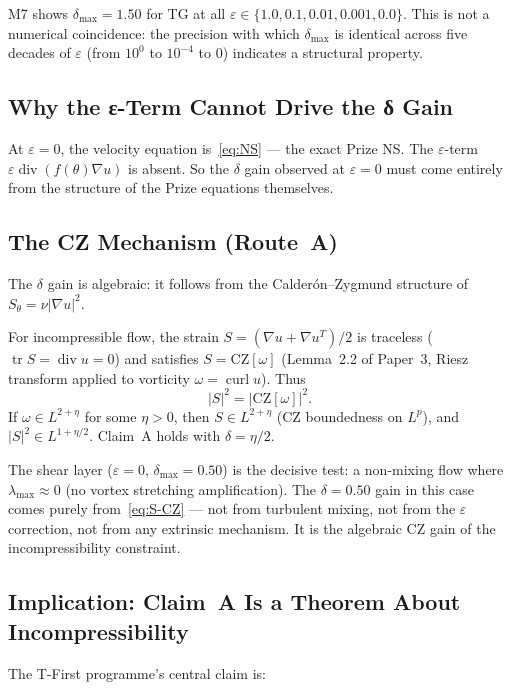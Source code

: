 \documentclass[11pt]{article}
\theoremstyle{definition}
\theoremstyle{remark}
\newcommand{\grad}{\nabla}
\newcommand{\divg}{\operatorname{div}}
\newcommand{\curl}{\operatorname{curl}}
\newcommand{\Sth}{S_\theta}
\newcommand{\dlt}{\delta}
\newcommand{\eps}{\varepsilon}
\begin{document}
M7 shows $\dlt_{\max}=1.50$ for TG at all $\eps\in\{1.0,0.1,0.01,0.001,0.0\}$.
This is not a numerical coincidence: the precision with which $\dlt_{\max}$
is identical across five decades of $\eps$ (from $10^0$ to $10^{-4}$ to $0$)
indicates a structural property.

\subsection{Why the ε-Term Cannot Drive the δ Gain}

At $\eps=0$, the velocity equation is~\eqref{eq:NS} — the exact Prize NS.
The $\eps$-term $\eps\divg(f(\theta)\grad u)$ is absent.  So the $\dlt$ gain
observed at $\eps=0$ must come entirely from the structure of the Prize
equations themselves.

\subsection{The CZ Mechanism (Route~A)}

The $\dlt$ gain is algebraic: it follows from the Calder\'on--Zygmund structure
of $\Sth = \nu|\grad u|^2$.

For incompressible flow, the strain $S = (\grad u + \grad u^T)/2$ is traceless
($\operatorname{tr}S = \divg u = 0$) and satisfies $S = \mathrm{CZ}[\omega]$
(Lemma~2.2 of Paper~3, Riesz transform applied to vorticity $\omega=\curl u$).
Thus
\begin{equation}\label{eq:S-CZ}
  |S|^2 = |\mathrm{CZ}[\omega]|^2.
\end{equation}
If $\omega\in L^{2+\eta}$ for some $\eta>0$, then $S\in L^{2+\eta}$ (CZ
boundedness on $L^p$), and $|S|^2\in L^{1+\eta/2}$.  Claim~A holds with
$\dlt=\eta/2$.

The shear layer ($\eps=0$, $\dlt_{\max}=0.50$) is the decisive test:
a non-mixing flow where $\lambda_{\max}\approx 0$ (no vortex stretching amplification).
The $\dlt=0.50$ gain in this case comes purely from~\eqref{eq:S-CZ} — not
from turbulent mixing, not from the $\eps$ correction, not from any extrinsic
mechanism.  It is the algebraic CZ gain of the incompressibility constraint.

\subsection{Implication: Claim~A Is a Theorem About Incompressibility}

The T-First programme's central claim is:
\end{document}
